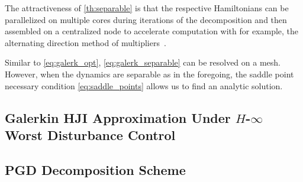The attractiveness of \eqref{th:separable} is that the respective Hamiltonians can be parallelized on multiple cores during iterations of the decomposition and then assembled on a centralized node to accelerate computation with for example, the alternating direction method of multipliers~\cite{BoydADMM}.  

Similar to \eqref{eq:galerk_opt}, \eqref{eq:galerk_separable} can be resolved on a mesh. However, when the dynamics are separable as in the foregoing, the saddle point necessary condition \ie \eqref{eq:saddle_points} allows us to find an analytic solution. 
%

\subsection{Galerkin HJI Approximation Under $H$-$\infty$ Worst Disturbance Control}
\label{sec:hinfty}



\subsection{PGD Decomposition Scheme}%
%

%


